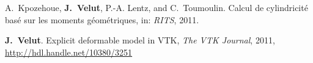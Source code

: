 %
\renewcommand{\refname}{\normalsize{Conf\'erences nationales avec
		    comit\'e de lecture }}
\vspace{-10pt}
\begin{thebibliography}{1}
\setlength{\itemsep}{\myitemsep}
%
A.~Kpozehoue, \textbf{J.~Velut}, P.-A. Lentz, and C.~Toumoulin.
\newblock Calcul de cylindricit\'e
  bas\'e sur les moments g\'eom\'etriques, 
\newblock in: \emph{RITS}, 2011.
\end{thebibliography}
%
\renewcommand{\refname}{\normalsize{Publications en ligne }}
\begin{thebibliography}{1}
\vspace{-10pt}
\setlength{\itemsep}{\myitemsep}
%
\textbf{J.~Velut}.
\newblock Explicit deformable model in VTK,
\newblock \emph{The VTK Journal}, 2011, \url{http://hdl.handle.net/10380/3251}
\end{thebibliography}
%